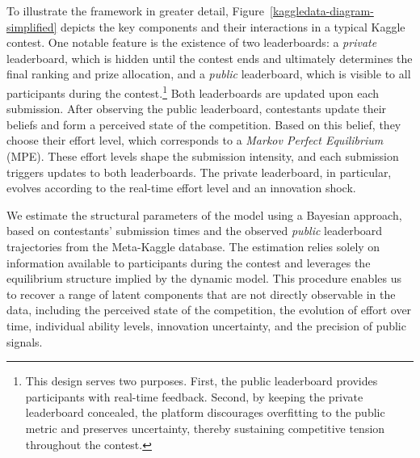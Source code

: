 \documentclass[mnsc]{informs3}
\begin{document}
To illustrate the framework in greater detail, Figure~\ref{kaggledata-diagram-simplified} depicts the key components and their interactions in a typical Kaggle contest.
One notable feature is the existence of two leaderboards: a \textit{private} leaderboard, which is hidden until the contest ends and ultimately determines the final ranking and prize allocation, and a \textit{public} leaderboard, which is visible to all participants during the contest.\footnote{
This design serves two purposes.
First, the public leaderboard provides participants with real-time feedback.
Second, by keeping the private leaderboard concealed, the platform discourages overfitting to the public metric and preserves uncertainty, thereby sustaining competitive tension throughout the contest.
}
Both leaderboards are updated upon each submission.
After observing the public leaderboard, contestants update their beliefs and form a perceived state of the competition.
Based on this belief, they choose their effort level, which corresponds to a \textit{Markov Perfect Equilibrium} (MPE).
These effort levels shape the submission intensity, and each submission triggers updates to both leaderboards.
The private leaderboard, in particular, evolves according to the real-time effort level and an innovation shock.


We estimate the structural parameters of the model using a Bayesian approach, based on contestants’ submission times and the observed \textit{public} leaderboard trajectories from the Meta-Kaggle database.
The estimation relies solely on information available to participants during the contest and leverages the equilibrium structure implied by the dynamic model.
This procedure enables us to recover a range of latent components that are not directly observable in the data, including the perceived state of the competition, the evolution of effort over time, individual ability levels, innovation uncertainty, and the precision of public signals.
\end{document}
